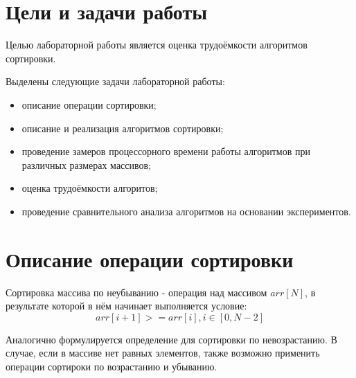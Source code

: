 \section{Цели и задачи работы}
Целью лабораторной работы является оценка трудоёмкости алгоритмов сортировки.

Выделены следующие задачи лабораторной работы:

\begin{itemize}
\item описание операции сортировки;
\item описание и реализация алгоритмов сортировки;
\item проведение замеров процессорного времени работы алгоритмов при различных размерах массивов;
\item оценка трудоёмкости алгоритов;
\item проведение сравнительного анализа алгоритмов на основании экспериментов.
\end{itemize}

\section{Описание операции сортировки}
Сортировка массива по неубыванию - операция над массивом $arr[N]$, в результате которой в нём начинает выполняется условие\cite{sort_def}:
\begin{equation} 
	arr[i+1] >= arr[i], i \in [0, N-2]
\end{equation}

Аналогично формулируется определение для сортировки по невозрастанию. В случае, если в массиве нет равных элементов, также возможно применить операции сортироки по возрастанию и убыванию.

